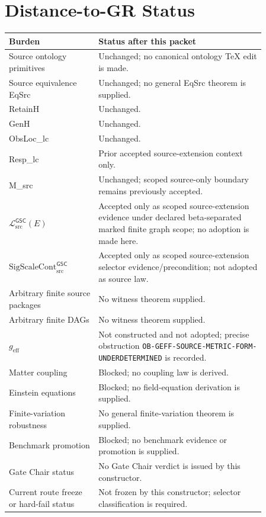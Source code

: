 \documentclass[11pt]{article}
\newcommand{\MetricData}{\mathcal{L}_{\mathrm{src}}^{\mathsf{GSC}}}
\newcommand{\geff}{g_{\mathrm{eff}}}
\newcommand{\SigScaleCont}{\mathrm{SigScaleCont}_{\mathrm{src}}^{\mathsf{GSC}}}
\begin{document}
\section{Distance-to-GR Status}

\begin{longtable}{p{0.30\linewidth}p{0.56\linewidth}}
\toprule
Burden & Status after this packet \\
\midrule
Source ontology primitives & Unchanged; no canonical ontology TeX edit is made. \\
Source equivalence EqSrc & Unchanged; no general EqSrc theorem is supplied. \\
RetainH & Unchanged. \\
GenH & Unchanged. \\
ObsLoc\_lc & Unchanged. \\
Resp\_lc & Prior accepted source-extension context only. \\
M\_src & Unchanged; scoped source-only boundary remains previously accepted. \\
\(\MetricData(E)\) & Accepted only as scoped source-extension evidence under
declared beta-separated marked finite graph scope; no adoption is made here. \\
\(\SigScaleCont\) & Accepted only as scoped source-extension selector
evidence/precondition; not adopted as source law. \\
Arbitrary finite source packages & No witness theorem supplied. \\
Arbitrary finite DAGs & No witness theorem supplied. \\
\(\geff\) & Not constructed and not adopted; precise obstruction
\texttt{OB-GEFF-SOURCE-METRIC-FORM-UNDERDETERMINED} is recorded. \\
Matter coupling & Blocked; no coupling law is derived. \\
Einstein equations & Blocked; no field-equation derivation is supplied. \\
Finite-variation robustness & No general finite-variation theorem is supplied. \\
Benchmark promotion & Blocked; no benchmark evidence or promotion is supplied. \\
Gate Chair status & No Gate Chair verdict is issued by this constructor. \\
Current route freeze or hard-fail status & Not frozen by this constructor;
selector classification is required. \\
\bottomrule
\end{longtable}
\end{document}
